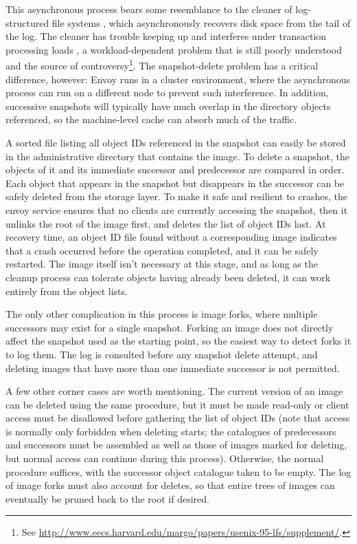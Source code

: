 This asynchronous process bears some resemblance to the cleaner of log-structured file systems \cite{rosenblum}, which asynchronously recovers disk space from the tail of the log. The cleaner has trouble keeping up and interferes under transaction processing loads \cite{seltzer93,seltzer95}, a workload-dependent problem that is still poorly understood and the source of controversy\footnote{See \url{http://www.eecs.harvard.edu/margo/papers/usenix-95-lfs/supplement/}.}. The snapshot-delete problem has a critical difference, however: Envoy runs in a cluster environment, where the asynchronous process can run on a different node to prevent such interference. In addition, successive snapshots will typically have much overlap in the directory objects referenced, so the machine-level cache can absorb much of the traffic.

A sorted file listing all object IDs referenced in the snapshot can easily be stored in the administrative directory that contains the image. To delete a snapshot, the objects of it and its immediate successor and predecessor are compared in order. Each object that appears in the snapshot but disappears in the successor can be safely deleted from the storage layer. To make it safe and resilient to crashes, the envoy service ensures that no clients are currently accessing the snapshot, then it unlinks the root of the image first, and deletes the list of object IDs last. At recovery time, an object ID file found without a corresponding image indicates that a crash occurred before the operation completed, and it can be safely restarted. The image itself isn't necessary at this stage, and as long as the cleanup process can tolerate objects having already been deleted, it can work entirely from the object lists.

The only other complication in this process is image forks, where multiple successors may exist for a single snapshot. Forking an image does not directly affect the snapshot used as the starting point, so the easiest way to detect forks it to log them. The log is consulted before any snapshot delete attempt, and deleting images that have more than one immediate successor is not permitted.

A few other corner cases are worth mentioning. The current version of an image can be deleted using the same procedure, but it must be made read-only or client access must be disallowed before gathering the list of object IDs (note that access is normally only forbidden when deleting starts; the catalogues of predecessors and successors must be assembled as well as those of images marked for deleting, but normal access can continue during this process). Otherwise, the normal procedure suffices, with the successor object catalogue taken to be empty. The log of image forks must also account for deletes, so that entire trees of images can eventually be pruned back to the root if desired.

